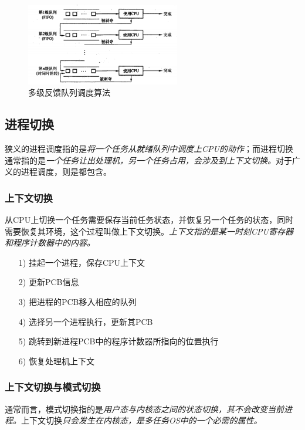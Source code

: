 \begin{figure}[!htbp]
    \centering
    \includegraphics[width=0.6\textwidth]{image/chapter02/多级反馈队列调度算法.png}
    \caption{多级反馈队列调度算法}
\end{figure}

\subsection{进程切换}

    狭义的进程调度指的是\emph{将一个任务从就绪队列中调度上CPU的动作}；而进程切换通常指的是\emph{一个任务让出处理机，另一个任务占用，会涉及到上下文切换。}对于广义的进程调度，则是都包含。

\subsubsection{上下文切换}

    从CPU上切换一个任务需要保存当前任务状态，并恢复另一个任务的状态，同时需要恢复其环境，这个过程叫做上下文切换。\emph{上下文指的是某一时刻CPU寄存器和程序计数器中的内容。}

\begin{itemize}
    \item [1)] 挂起一个进程，保存CPU上下文
    \item [2)] 更新PCB信息
    \item [3)] 把进程的PCB移入相应的队列
    \item [4)] 选择另一个进程执行，更新其PCB
    \item [5)] 跳转到新进程PCB中的程序计数器所指向的位置执行
    \item [6)] 恢复处理机上下文
\end{itemize}

\subsubsection{上下文切换与模式切换}

    通常而言，模式切换指的是\emph{用户态与内核态之间的状态切换，其不会改变当前进程。}上下文切换\emph{\color{red}只会发生在内核态，是多任务OS中的一个必需的属性。}

